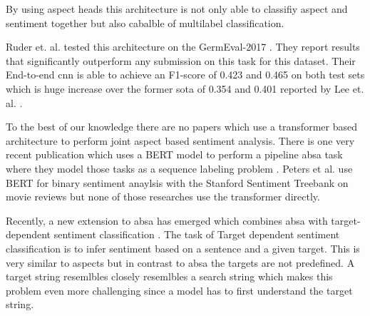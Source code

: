 By using aspect heads this architecture is not only able to classifiy aspect and sentiment together but also cabalble of multilabel classification.

Ruder et. al. tested this architecture on the GermEval-2017 \cite{Wojatzki2017}. They report results that significantly outperform any submission on this task for this dataset. Their End-to-end \gls{cnn} is able to achieve an F1-score of 0.423 and 0.465 on both test sets which is huge increase over the former \acrfull{sota} of 0.354 and 0.401 reported by Lee et. al. \cite{Lee2017}.
\medskip

To the best of our knowledge there are no papers which use a transformer based architecture to perform joint aspect based sentiment analysis. There is one very recent publication which uses a BERT \cite{Devlin2018} model to perform a pipeline \gls{absa} task where they model those tasks as a sequence labeling problem \cite{Xu2019}. Peters et al. use BERT for binary sentiment anaylsis with the Stanford Sentiment Treebank \cite{Socher2013} on movie reviews \cite{Peters2019} but none of those researches use the transformer directly.
\medskip

Recently, a new extension to \gls{absa} has emerged which combines \gls{absa} with target-dependent sentiment classification \cite{Tang2016}. The task of Target dependent sentiment classification is to infer sentiment based on a sentence and a given target. This is very similar to aspects but in contrast to \gls{absa} the targets are not predefined. A target string resemlbles closely resemlbles a search string which makes this problem even more challenging since a model has to first understand the target string.